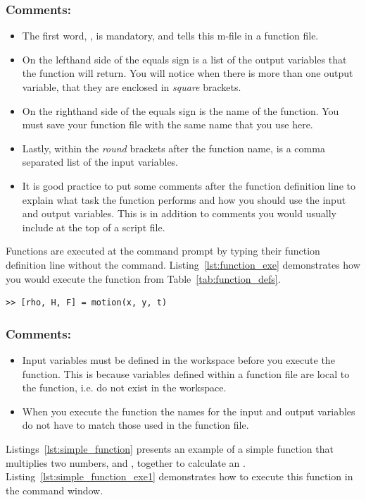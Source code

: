 \subsubsection{Comments:}
\begin{itemize}
\item The first word, , is mandatory, and tells \mlab this m-file in a function file.
\item On the lefthand side of the equals sign is a list of the output variables that the function will return. You will notice when there is more than one output variable, that they are enclosed in \textit{square} brackets.
\item On the righthand side of the equals sign is the name of the function. You must save your function file with the same name that you use here.
\item Lastly, within the \textit{round} brackets after the function name, is a comma separated list of the input variables.
\item It is good practice to put some comments after the function definition line to explain what task the function performs and how you should use the input and output variables. This is in addition to comments you would usually include at the top of a script file.
\end{itemize}

Functions are executed at the command prompt by typing their function definition line without the  command. Listing~\ref{lst:function_exe} demonstrates how you would execute the  function from Table~\ref{tab:function_defs}.
\begin{lstlisting}[caption={Executing a function},label=lst:function_exe]
>> [rho, H, F] = motion(x, y, t)
\end{lstlisting}

\subsubsection{Comments:}
\begin{itemize}
\item Input variables  must be defined in the workspace before you execute the function. This is because variables defined within a function file are local to the function, i.e. do not exist in the workspace.
\item When you execute the function the names for the input and output variables do not have to match those used in the function file.
\end{itemize}
\newpage
Listings~\ref{lst:simple_function} presents an example of a simple function that multiplies two numbers,  and , together to calculate an . Listing~\ref{lst:simple_function_exe1} demonstrates how to execute this function in the command window.

